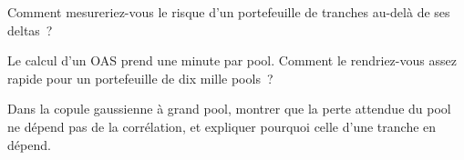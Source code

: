 \begin{interviewq}\label{iq:s2:mortgage-and-structured-credit-strategies:4}
Comment mesureriez-vous le risque d'un portefeuille de tranches au-delà de ses deltas~?
\end{interviewq}

\begin{interviewq}\label{iq:s2:mortgage-and-structured-credit-strategies:5}
Le calcul d'un OAS prend une minute par pool. Comment le rendriez-vous assez rapide pour un portefeuille de dix mille pools~?
\end{interviewq}

\begin{interviewq}\label{iq:s2:mortgage-and-structured-credit-strategies:6}
Dans la copule gaussienne à grand pool, montrer que la perte attendue du pool ne dépend pas de la corrélation, et expliquer pourquoi celle d'une tranche en dépend.
\end{interviewq}
